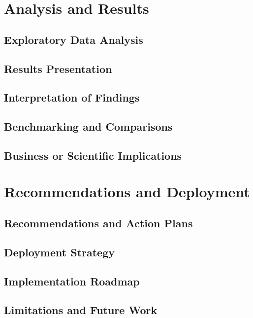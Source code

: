 \documentclass[11pt,a4paper]{article}
\begin{document}
\section{Analysis and Results}

\subsection{Exploratory Data Analysis}

\subsection{Results Presentation}

\subsection{Interpretation of Findings}

\subsection{Benchmarking and Comparisons}

\subsection{Business or Scientific Implications}


\section{Recommendations and Deployment}

\subsection{Recommendations and Action Plans}

\subsection{Deployment Strategy}

\subsection{Implementation Roadmap}

\subsection{Limitations and Future Work}
\end{document}
